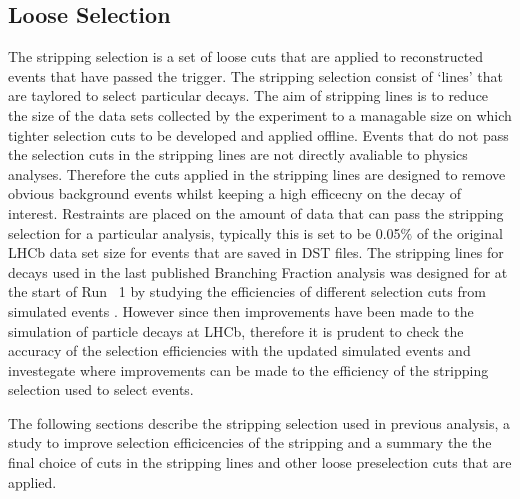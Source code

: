 \subsection{Loose Selection}
\label{sec:stripping}

The stripping selection is a set of loose cuts that are applied to reconstructed events that have passed the trigger. The stripping selection consist of `lines' that are taylored to select particular decays. The aim of stripping lines is to reduce the size of the data sets collected by the experiment to a managable size on which tighter selection cuts to be developed and applied offline. Events that do not pass the selection cuts in the stripping lines are not directly avaliable to physics analyses. Therefore the cuts applied in the stripping lines are designed to remove obvious background events whilst keeping a high efficecny on the decay of interest. Restraints are placed on the amount of data that can pass the stripping selection for a particular analysis, typically this is set to be 0.05$\%$ of the original LHCb data set size for events that are saved in DST files. 
The stripping lines for \bsmumu decays used in the last published Branching Fraction analysis was designed for at the start of Run ~1 by studying the efficiencies of different selection cuts from simulated events \cite{}. However since then improvements have been made to the simulation of particle decays at LHCb, therefore it is prudent to check the accuracy of the selection efficiencies with the updated simulated events and investegate where improvements can be made to the efficiency of the stripping selection used to select \bsmumu events.  

The following sections describe the stripping selection used in previous analysis, a study to improve \bsmumu selection efficicencies of the stripping and a summary the the final choice of cuts in the stripping lines and other loose preselection cuts that are applied. 

